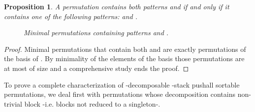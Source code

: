 \documentclass[11pt]{article}
\newtheorem{prop}[thm]{Proposition}
\newcommand{\pushall}{-stack pushall sortable\xspace}
\newcounter{indice}
\newcommand{\permutation}[1]{
\setcounter{indice}{0};
\foreach \i in {#1} 
\addtocounter{indice}{1};

\addtocounter{indice}{1}
\draw [help lines] (1,1) grid (\theindice,\theindice);

\setcounter{indice}{1};

\foreach \i in { #1 } {
\draw (\theindice+.5,\i+.5) [fill] circle (.2);
\addtocounter{indice}{1};
}
\addtocounter{indice}{-1};
}
\begin{document}
\begin{prop}\label{prop:132et213}
A permutation  contains both patterns  and  if and only if it contains one of the following patterns:
 and .

\begin{figure}[H]
\begin{center}
\caption{Minimal permutations containing patterns  and .}
\label{fig:132et213}
\end{center}
\end{figure}
\end{prop}

\begin{proof}
Minimal permutations that contain both  and  are exactly permutations of the basis of . 
By minimality of the elements of the basis those permutations are at most of size  and a comprehensive study ends the proof.
\end{proof}

To prove a complete characterization of -decomposable \pushall permutations, we deal first with permutations whose decomposition contains non-trivial block -i.e. blocks not reduced to a singleton-.
\end{document}
